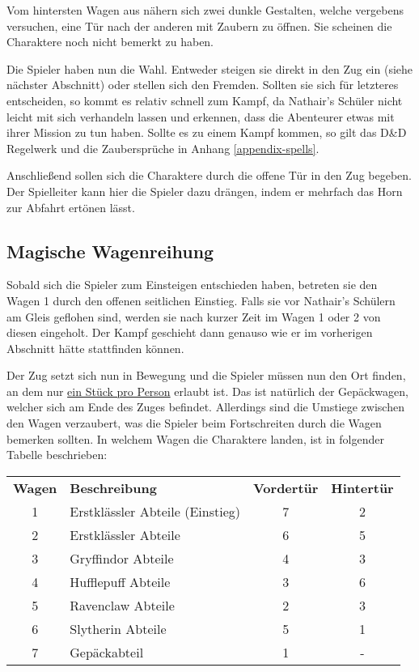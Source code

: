 \documentclass[]{scrartcl}
\begin{document}
Vom hintersten Wagen aus nähern sich zwei dunkle Gestalten, welche vergebens versuchen, eine Tür nach der anderen mit Zaubern zu öffnen. Sie scheinen die Charaktere noch nicht bemerkt zu haben.


Die Spieler haben nun die Wahl. Entweder steigen sie direkt in den Zug ein (siehe nächster Abschnitt) oder stellen sich den Fremden. Sollten sie sich für letzteres entscheiden, so kommt es relativ schnell zum Kampf, da Nathair's Schüler nicht leicht mit sich verhandeln lassen und erkennen, dass die Abenteurer etwas mit ihrer Mission zu tun haben. Sollte es zu einem Kampf kommen, so gilt das D\&D Regelwerk und die Zaubersprüche in Anhang \ref{appendix-spells}.

Anschließend sollen sich die Charaktere durch die offene Tür in den Zug begeben. Der Spielleiter kann hier die Spieler dazu drängen, indem er mehrfach das Horn zur Abfahrt ertönen lässt.

\subsection{Magische Wagenreihung}

Sobald sich die Spieler zum Einsteigen entschieden haben, betreten sie den Wagen 1 durch den offenen seitlichen Einstieg. Falls sie vor Nathair's Schülern am Gleis geflohen sind, werden sie nach kurzer Zeit im Wagen 1 oder 2 von diesen eingeholt. Der Kampf geschieht dann genauso wie er im vorherigen Abschnitt hätte stattfinden können.

Der Zug setzt sich nun in Bewegung und die Spieler müssen nun den Ort finden, an dem nur \underline{ein Stück pro Person} erlaubt ist. Das ist natürlich der Gepäckwagen, welcher sich am Ende des Zuges befindet. Allerdings sind die Umstiege zwischen den Wagen verzaubert, was die Spieler beim Fortschreiten durch die Wagen bemerken sollten. In welchem Wagen die Charaktere landen, ist in folgender Tabelle beschrieben:\\

\begin{center}
	\begin{tabularx}{0.8\linewidth}{clcc}
		\textbf{Wagen} & \textbf{Beschreibung} & \textbf{Vordertür} & \textbf{Hintertür}\\
		1 & Erstklässler Abteile (Einstieg) & 7 & 2\\
		2 & Erstklässler Abteile & 6 & 5\\
		3 & Gryffindor Abteile & 4 & 3\\
		4 & Hufflepuff Abteile & 3 & 6\\
		5 & Ravenclaw Abteile & 2 & 3\\
		6 & Slytherin Abteile & 5 & 1\\
		7 & Gepäckabteil & 1 & -
	\end{tabularx}
\end{center}
\end{document}
